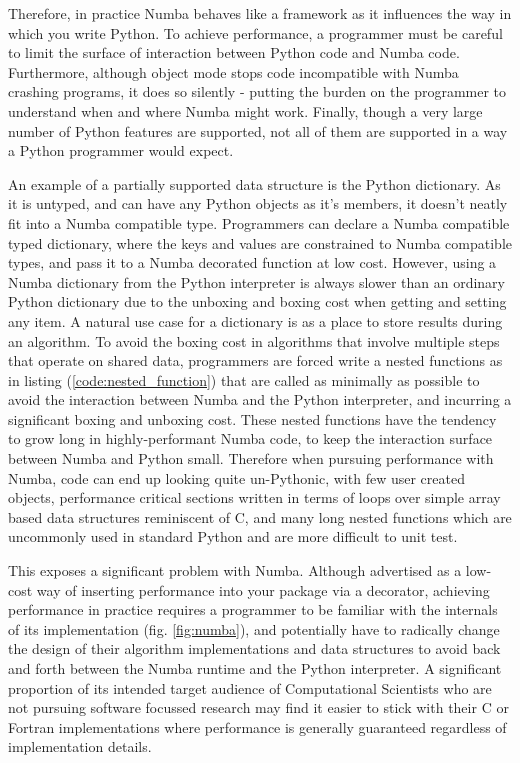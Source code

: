 \documentclass{IEEEcsmag}
\begin{document}
Therefore, in practice Numba behaves like a framework as it influences the way in which you write Python. To achieve performance, a programmer must be careful to limit the surface of interaction between Python code and Numba code. Furthermore, although object mode stops code incompatible with Numba crashing programs, it does so silently - putting the burden on the programmer to understand when and where Numba might work. Finally, though a very large number of Python features are supported, not all of them are supported in a way a Python programmer would expect.

An example of a partially supported data structure is the Python dictionary. As it is untyped, and can have any Python objects as it's members, it doesn't neatly fit into a Numba compatible type. Programmers can declare a Numba compatible typed dictionary, where the keys and values are constrained to Numba compatible types, and pass it to a Numba decorated function at low cost. However, using a Numba dictionary from the Python interpreter is always slower than an ordinary Python dictionary due to the unboxing and boxing cost when getting and setting any item. A natural use case for a dictionary is as a place to store results during an algorithm. To avoid the boxing cost in algorithms that involve multiple steps that operate on shared data, programmers are forced write a nested functions as in listing (\ref{code:nested_function}) that are called as minimally as possible to avoid the interaction between Numba and the Python interpreter, and incurring a significant boxing and unboxing cost. These nested functions have the tendency to grow long in highly-performant Numba code, to keep the interaction surface between Numba and Python small. Therefore when pursuing performance with Numba, code can end up looking quite un-Pythonic, with few user created objects, performance critical sections written in terms of loops over simple array based data structures reminiscent of C, and many long nested functions which are uncommonly used in standard Python and are more difficult to unit test.

This exposes a significant problem with Numba. Although advertised as a low-cost way of inserting performance into your package via a decorator, achieving performance in practice requires a programmer to be familiar with the internals of its implementation (fig. \ref{fig:numba}), and potentially have to radically change the design of their algorithm implementations and data structures to avoid back and forth between the Numba runtime and the Python interpreter. A significant proportion of its intended target audience of Computational Scientists who are not pursuing software focussed research may find it easier to stick with their C or Fortran implementations where performance is generally guaranteed regardless of implementation details.
\end{document}
